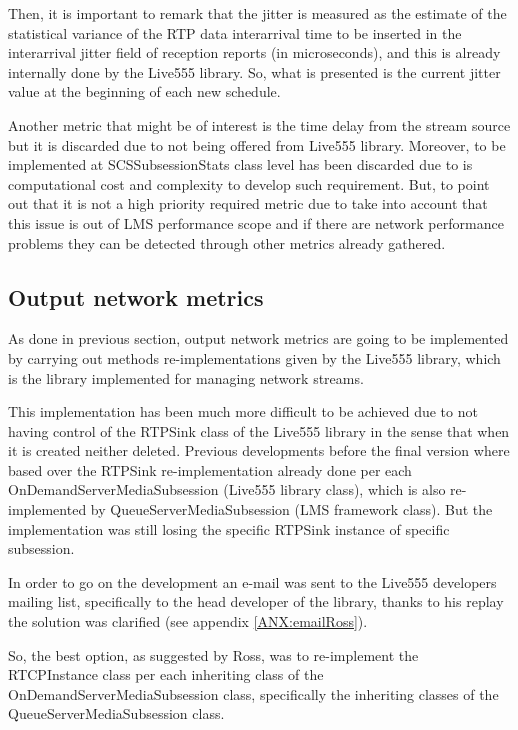 Then, it is important to remark that the jitter is measured as the estimate of the statistical variance of the RTP data interarrival time to be inserted in the interarrival jitter field of reception reports (in microseconds), and this is already internally done by the Live555 library. So, what is presented is the current jitter value at the beginning of each new schedule.

Another metric that might be of interest is the time delay from the stream source but it is discarded due to not being offered from Live555 library. Moreover, to be implemented at SCSSubsessionStats class level has been discarded due to is computational cost and complexity to develop such requirement. But, to point out that it is not a high priority required metric due to take into account that this issue is out of LMS performance scope and if there are network performance problems they can be detected through other metrics already gathered.


\subsection{Output network metrics}

As done in previous section, output network metrics are going to be implemented by carrying out methods re-implementations given by the Live555 library, which is the library implemented for managing network streams.

This implementation has been much more difficult to be achieved due to not having control of the RTPSink class of the Live555 library in the sense that when it is created neither deleted. Previous developments before the final version where based over the RTPSink re-implementation already done per each OnDemandServerMediaSubsession (Live555 library class), which is also re-implemented by QueueServerMediaSubsession (LMS framework class). But the implementation was still losing the specific RTPSink instance of specific subsession.

In order to go on the development an e-mail was sent to the Live555 developers mailing list, specifically to the head developer of the library, thanks to his replay the solution was clarified (see appendix \ref{ANX:emailRoss}).

So, the best option, as suggested by Ross, was to re-implement the RTCPInstance class per each inheriting class of the OnDemandServerMediaSubsession class, specifically the inheriting classes of the QueueServerMediaSubsession class. 

